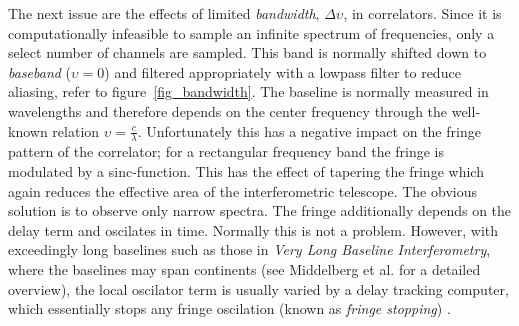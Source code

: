 \documentclass[a4paper,10pt]{report}
\begin{document}
The next issue are the effects of limited \textit{bandwidth}, $\Delta\upsilon$, in correlators. Since it is computationally infeasible to sample an infinite spectrum of frequencies, only a select number of channels are sampled. This
band is normally shifted down to \textit{baseband} ($\upsilon=0$) and filtered appropriately with a lowpass filter to reduce aliasing, refer to figure~\ref{fig_bandwidth}. The baseline is normally measured in wavelengths and therefore depends on the
center frequency through the well-known relation $\upsilon=\frac{c}{\lambda}$. Unfortunately this has a negative impact on the fringe pattern of the correlator; for a rectangular frequency band the fringe is modulated by a sinc-function. This has
the effect of tapering the fringe which again reduces the effective area of the interferometric telescope. The obvious solution is to observe only narrow spectra. The fringe additionally depends on the delay term and oscilates in time. Normally this is not a problem. However, with exceedingly long baselines such as those in \textit{Very Long Baseline Interferometry}, where the baselines may span continents (see Middelberg et al. \cite{middelberg2008high} for a detailed overview), the local oscilator term is usually varied 
by a delay tracking computer, which essentially stops any fringe oscilation (known as \textit{fringe stopping}) \cite{taylor1999synthesis}.
\end{document}
